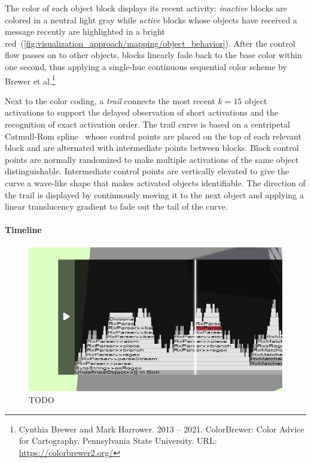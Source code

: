 The color of each object block displays its recent activity:
\emph{inactive} blocks are colored in a neutral light gray while \emph{active} blocks whose objects have received a message recently are highlighted in a bright red~(\cref{fig:visualization_approach/mapping/object_behavior}).
After the control flow passes on to other objects, blocks linearly fade back to the base color within one second, thus applying a single-hue continuous sequential color scheme by Brewer et al.\footnote{Cynthia Brewer and Mark Harrower. 2013 -- 2021. ColorBrewer: Color Advice for Cartography. Pennsylvania State University. URL: \url{https://colorbrewer2.org/}}

Next to the color coding, a \emph{trail} connects the most recent $k = 15$ object activations to support the delayed observation of short activations and the recognition of exact activation order.
The trail curve is based on a centripetal Catmull-Rom spline~\cite{catmull1974class} whose control points are placed on the top of each relevant block and are alternated with intermediate points between blocks.
Block control points are normally randomized to make multiple activations of the same object distinguishable.
Intermediate control points are vertically elevated to give the curve a wave-like shape that makes activated objects identifiable.
The direction of the trail is displayed by continuously moving it to the next object and applying a linear translucency gradient to fade out the tail of the curve.

\paragraph{Timeline}
\label{sec:visualization_approach/mapping/timeline}

\begin{figure}
	\includegraphics[width=\linewidth]{sections/03_visualization_approach/mapping/timeline}
	\caption{TODO}
	\label{fig:visualization_approach/mapping/timeline}
\end{figure}


